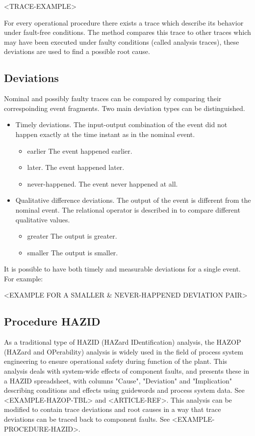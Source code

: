 \documentclass[conference]{IEEEtran}
\begin{document}
<TRACE-EXAMPLE>

For every operational procedure there exists a trace which describe its behavior under fault-free conditions. The method compares this trace to other traces which may have been executed under faulty conditions (called analysis traces), these deviations are used to find a possible root cause.

\subsection{Deviations}
Nominal and possibly faulty traces can be compared by comparing their correspoinding event fragments. Two main deviation types can be distinguished.

\begin{itemize}
\item Timely deviations. The input-output combination of the event did not happen exactly at the time instant as in the nominal event. 
	\begin{itemize}
	  \item earlier The event happened earlier.
	  \item later. The event happened later.
	  \item never-happened. The event never happened at all.
	\end{itemize}
\item Qualitative difference deviations. The output of the event is different from the nominal event. The relational operator is described in \cite{QUALCAL} to compare different qualitative values.
	\begin{itemize}
	  \item greater The output is greater.
	  \item smaller The output is smaller.
	\end{itemize}
\end{itemize}

It is possible to have both timely and measurable deviations for a single event. For example:

<EXAMPLE FOR A SMALLER & NEVER-HAPPENED DEVIATION PAIR>

\subsection{Procedure HAZID}

As a traditional type of HAZID (HAZard IDentification) analysis, the HAZOP (HAZard and OPerability) analysis is widely used in the field of process system engineering to ensure operational safety during function of the plant. This analysis deals with system-wide effects of component faults, and presents these in a HAZID spreadsheet, with columns "Cause", "Deviation" and "Implication" describing conditions and effects using guidewords and process system data. See <EXAMPLE-HAZOP-TBL> and <ARTICLE-REF>. This analysis can be modified to contain trace deviations and root causes in a way that trace deviations can be traced back to component faults. See <EXAMPLE-PROCEDURE-HAZID>. 
\end{document}

